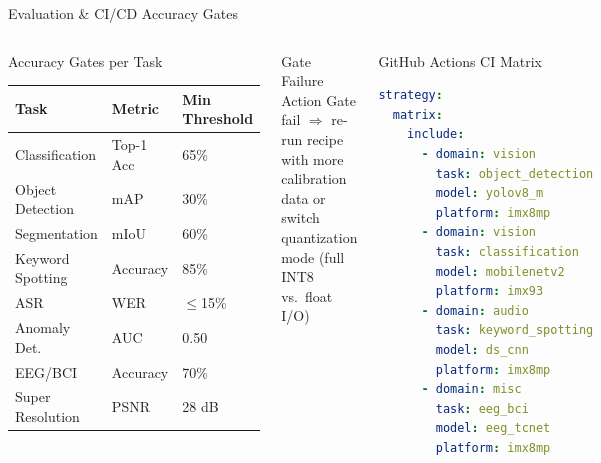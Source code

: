 \documentclass[aspectratio=169]{beamer}
\begin{document}
\begin{frame}{Evaluation \& CI/CD Accuracy Gates}
  \begin{columns}[T]
      \begin{block}{Accuracy Gates per Task}
        \centering\scriptsize
        \begin{tabular}{lll}
          \toprule
          \textbf{Task} & \textbf{Metric} & \textbf{Min Threshold} \\
          \midrule
          Classification  & Top-1 Acc & 65\% \\
          Object Detection& mAP       & 30\% \\
          Segmentation    & mIoU      & 60\% \\
          Keyword Spotting& Accuracy  & 85\% \\
          ASR             & WER       & $\leq$15\% \\
          Anomaly Det.    & AUC       & 0.50 \\
          EEG/BCI         & Accuracy  & 70\% \\
          Super Resolution& PSNR      & 28 dB \\
          \bottomrule
        \end{tabular}
      \end{block}
      \vspace{4pt}
      \begin{block}{Gate Failure Action}
        Gate fail $\Rightarrow$ re-run recipe with more calibration data or switch quantization mode (full INT8 vs.\ float I/O)
      \end{block}
      \begin{block}{GitHub Actions CI Matrix}
        \begin{lstlisting}[language=yaml]
strategy:
  matrix:
    include:
      - domain: vision
        task: object_detection
        model: yolov8_m
        platform: imx8mp
      - domain: vision
        task: classification
        model: mobilenetv2
        platform: imx93
      - domain: audio
        task: keyword_spotting
        model: ds_cnn
        platform: imx8mp
      - domain: misc
        task: eeg_bci
        model: eeg_tcnet
        platform: imx8mp
        \end{lstlisting}
      \end{block}
  \end{columns}
\end{frame}
\end{document}
